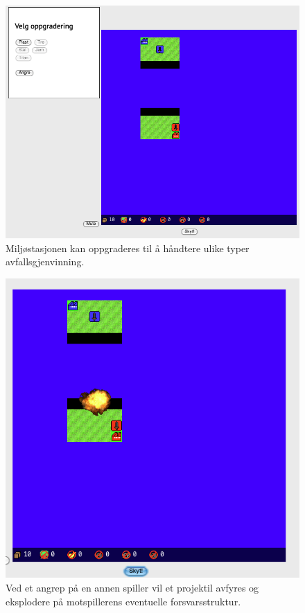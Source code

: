 \begin{center}
	\begin{figure}
		\includegraphics[width=\textwidth]{images/Oppgradering.png}
		\caption{Miljøstasjonen kan oppgraderes til å håndtere ulike typer avfallsgjenvinning.}
		\label{fig:Oppgradering}
	\end{figure}
\end{center}

\begin{center}
	\begin{figure}
		\includegraphics[width=\textwidth]{images/Eksplosjon.png}
		\caption{Ved et angrep på en annen spiller vil et projektil avfyres og eksplodere på motspillerens eventuelle forsvarsstruktur.}
		\label{fig:Eksplosjon}
	\end{figure}
\end{center}

